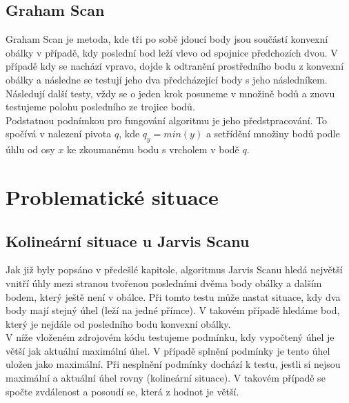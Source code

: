 \documentclass{article}
\begin{document}
\subsection{Graham Scan}
Graham Scan je metoda, kde tři po sobě jdoucí body jsou součástí konvexní obálky v případě, kdy poslední bod leží vlevo od spojnice předchozích dvou. V případě kdy se nachází vpravo, dojde k odtranění prostředního bodu z konvexní obálky a následne se testují jeho dva předcházející body s jeho následníkem. Následují další testy, vždy se o jeden krok posuneme v množině bodů a znovu testujeme polohu posledního ze trojice bodů.\\

Podstatnou podnímkou pro fungování algoritmu je jeho předstpracování. To spočívá v nalezení pivota $q$, kde $q_y=min(y)$ a setřídění množiny bodů podle úhlu od osy $x$ ke zkoumanému bodu s vrcholem v bodě $q$.

\newpage
\section{Problematické situace}
\subsection{Kolineární situace u Jarvis Scanu}
Jak již byly popsáno v předešlé kapitole, algoritmus Jarvis Scanu hledá největší vnitří úhly mezi stranou tvořenou posledními dvěma body obálky a dalším bodem, který ještě není v obálce. Při tomto testu může nastat situace, kdy dva body mají stejný úhel (leží na jedné přímce). V takovém případě hledáme bod, který je nejdále od posledního bodu konvexní obálky.\\

V níže vloženém zdrojovém kódu testujeme podmínku, kdy vypočtený úhel je větší jak aktuální maximální úhel. V případě splnění podmínky je tento úhel uložen jako maximální. Při nesplnění podmínky dochází k testu, jestli si nejsou maximální a aktuální úhel rovny (kolineární situace). V takovém případě se spočte zvdálenost a posoudí se, která z hodnot je větší.\\
 
\end{document}
